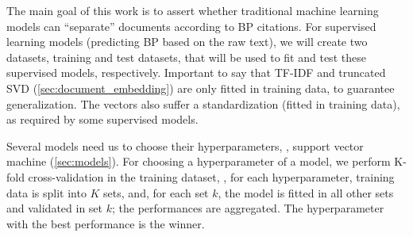     The main goal of this work is to assert whether traditional machine learning models can ``separate'' documents according to BP citations. For supervised learning models (predicting BP based on the raw text), we will create two datasets, training and test datasets, that will be used to fit and test these supervised models, respectively. Important to say that TF-IDF and truncated SVD (\autoref{sec:document_embedding}) are only fitted in training data, to guarantee generalization. The vectors also suffer a standardization (fitted in training data), as required by some supervised models.

    Several models need us to choose their hyperparameters, \eg, support vector machine (\autoref{sec:models}). For choosing a hyperparameter of a model, we perform K-fold cross-validation in the training dataset, \ie, for each hyperparameter, training data is split into $K$ sets, and, for each set $k$, the model is fitted in all other sets and validated in set $k$; the performances are aggregated. The hyperparameter with the best performance is the winner.

